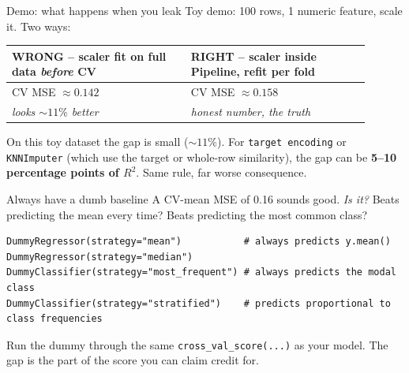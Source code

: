 \documentclass[aspectratio=169]{beamer}
\begin{document}
\begin{frame}{Demo: what happens when you leak}
  Toy demo: 100 rows, 1 numeric feature, scale it. Two ways:
  \vfill
  \begin{center}\small
    \renewcommand{\arraystretch}{1.5}
    \begin{tabular}{p{0.45\linewidth} p{0.45\linewidth}}
      \textbf{\textcolor{armred}{WRONG}} -- scaler fit on full data \emph{before} CV
       & \textbf{\textcolor{paramgreen}{RIGHT}} -- scaler inside Pipeline, refit per fold \\
      \hline
      CV MSE $\approx 0.142$ & CV MSE $\approx 0.158$ \\
      \emph{looks $\sim 11\%$ better} & \emph{honest number, the truth} \\
      \hline
    \end{tabular}
  \end{center}
  \vfill
  \footnotesize On this toy dataset the gap is small ($\sim 11\%$). For \texttt{target encoding} or \texttt{KNNImputer} (which use the target or whole-row similarity), the gap can be \textbf{5--10 percentage points of $R^2$}. Same rule, far worse consequence.
  \vfill
\end{frame}

\begin{frame}[fragile]{Always have a dumb baseline}
  A CV-mean MSE of 0.16 sounds good. \emph{Is it?} Beats predicting the mean every time? Beats predicting the most common class?
  \vfill
{\lstset{basicstyle=\ttfamily\scriptsize}
\begin{lstlisting}
DummyRegressor(strategy="mean")           # always predicts y.mean()
DummyRegressor(strategy="median")
DummyClassifier(strategy="most_frequent") # always predicts the modal class
DummyClassifier(strategy="stratified")    # predicts proportional to class frequencies
\end{lstlisting}}
  \vfill
  Run the dummy through the same \texttt{cross\_val\_score(...)} as your model. The gap is the part of the score you can claim credit for.
  \vfill
\end{frame}
\end{document}
